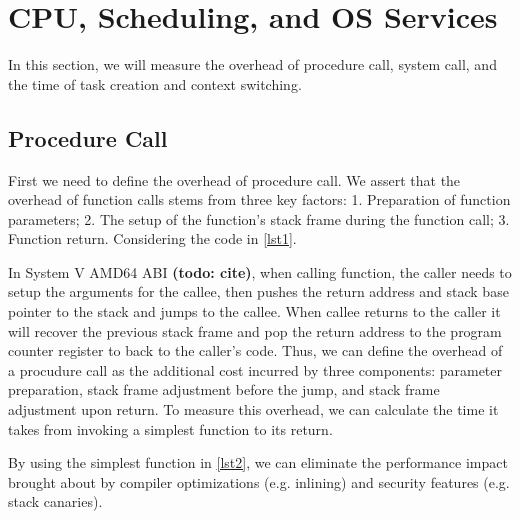 \section{CPU, Scheduling, and OS Services}
In this section, we will measure the overhead of procedure call, system call, and the time of task creation and context switching.

\subsection{Procedure Call}
First we need to define the overhead of procedure call. We assert that the overhead of function calls stems from three key factors: 1. Preparation of function parameters; 2. The setup of the function's stack frame during the function call; 3. Function return. Considering the code in \ref{lst1}. 

In System V AMD64 ABI \textbf{(todo: cite)}, when calling function, the caller needs to setup the arguments for the callee, then pushes the return address and stack base pointer to the stack and jumps to the callee. When callee returns to the caller it will recover the previous stack frame and pop the return address to the program counter register to back to the caller's code. Thus, we can define the overhead of a procudure call as the additional cost incurred by three components: parameter preparation, stack frame adjustment before the jump, and stack frame adjustment upon return. To measure this overhead, we can calculate the time it takes from invoking a simplest function to its return.

By using the simplest function in \ref{lst2}, we can eliminate the performance impact brought about by compiler optimizations (e.g. inlining) and security features (e.g. stack canaries).

